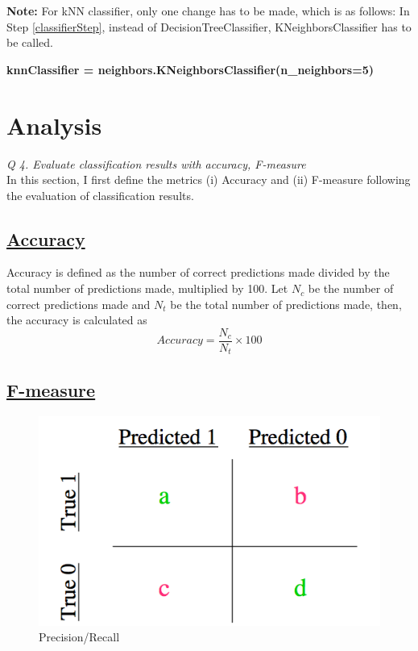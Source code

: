 \documentclass[journal,onecolumn]{IEEEtran}
\begin{document}
\textbf{Note:} For kNN classifier, only one change has to be made, which is as follows:
In Step \ref{classifierStep}, instead of DecisionTreeClassifier, KNeighborsClassifier has to be called.

	\textbf{knnClassifier = neighbors.KNeighborsClassifier(n\_neighbors=5)}
	
\section{\textbf{ Analysis}}
\textit{Q 4. Evaluate classification results with accuracy, F-measure} \\
In this section, I first define the metrics (i) Accuracy and (ii) F-measure following the evaluation of classification results.

\subsection{\underline{Accuracy}}
Accuracy is defined as the number of correct predictions made divided by the total number of predictions made, multiplied by 100.
Let $N_c$ be the number of correct predictions made and $N_t$ be the total number of predictions made, then, the accuracy is calculated as
\begin{equation}
Accuracy = \frac{N_c}{N_t} \times 100
\end{equation}

\subsection{\underline{F-measure}}


\begin{figure}[h]
\begin{center}
 \includegraphics[scale=0.4] {Plots/f1Score.png}
 \caption {Precision/Recall} \label{precision}
 \end{center}
\end{figure}
\end{document}
